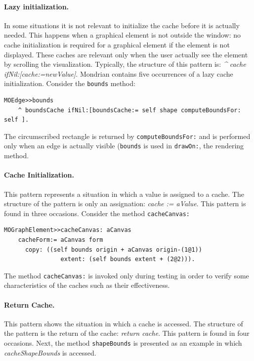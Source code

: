 \documentclass[preprint,10pt]{sigplanconf}
\newcommand{\ct}{\lstinline[backgroundcolor=\color{white},basicstyle=\footnotesize\ttfamily]}
\begin{document}
\paragraph{Lazy initialization.} In some situations it is not relevant to initialize the cache before it is actually needed. This happens when a graphical element is not outside the window: no cache initialization is required for a graphical element if the element is not displayed. These caches are relevant only when the user actually see the element by scrolling the visualization. Typically, the structure of this pattern is: \emph{\^{} cache ifNil:[cache:=newValue]}. Mondrian contains five occurrences of a lazy cache initialization. Consider the \ct{bounds} method:

\begin{lstlisting} 
MOEdge>>bounds  
	^ boundsCache ifNil:[boundsCache:= self shape computeBoundsFor: self ]. 
\end{lstlisting}

The circumscribed rectangle is returned by \ct{computeBoundsFor:} and is performed only when an edge is actually visible (\ct{bounds} is used in \ct{drawOn:}, the rendering method.

\paragraph{Cache Initialization.} This pattern represents a situation in
which a value is assigned to a cache. The structure of the pattern
is only an assignation: \emph{cache := aValue}. This pattern is found
in three occasions. Consider the method \ct{cacheCanvas:}

\begin{lstlisting} 
MOGraphElement>>cacheCanvas: aCanvas 
	cacheForm:= aCanvas form 
	  copy: ((self bounds origin + aCanvas origin-(1@1)) 
				extent: (self bounds extent + (2@2))). 
\end{lstlisting}

The method \ct{cacheCanvas:} is invoked only during testing in order to verify some characteristics of the caches such as their effectiveness.

\paragraph{Return Cache.} This pattern shows the situation in which a cache
is accessed. The structure of the pattern is the return of the cache:
\emph{return cache}. This pattern is found in four occasions. Next, the method \ct{shapeBounds} is presented as an example in which
\emph{cacheShapeBounds} is accessed.
\end{document}
